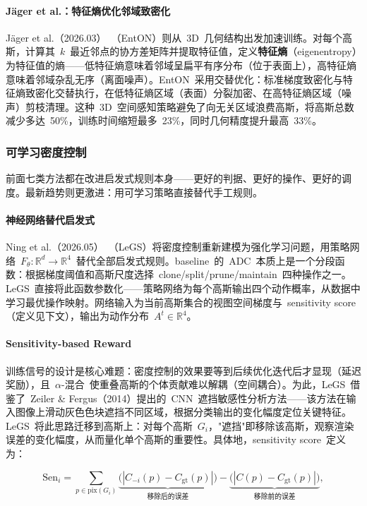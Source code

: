\paragraph{Jäger et al.：特征熵优化邻域致密化}
Jäger et al.（2026.03）~\cite{2603_06216}（EntON）则从~3D~几何结构出发加速训练。对每个高斯，计算其~$k$~最近邻点的协方差矩阵并提取特征值，定义\textbf{特征熵}（eigenentropy）为特征值的熵——低特征熵意味着邻域呈扁平有序分布（位于表面上），高特征熵意味着邻域杂乱无序（离面噪声）。EntON~采用交替优化：标准梯度致密化与特征熵致密化交替执行，在低特征熵区域（表面）分裂加密、在高特征熵区域（噪声）剪枝清理。这种~3D~空间感知策略避免了向无关区域浪费高斯，将高斯总数减少多达~50\%，训练时间缩短最多~23\%，同时几何精度提升最高~33\%。

\subsubsection{可学习密度控制}

前面七类方法都在改进启发式规则本身——更好的判据、更好的操作、更好的调度。最新趋势则更激进：用可学习策略直接替代手工规则。

\paragraph{神经网络替代启发式}

Ning et al.（2026.05）~\cite{2605_00408}（LeGS）将密度控制重新建模为强化学习问题，用策略网络~$F_\theta: \mathbb{R}^d \to \mathbb{R}^4$~替代全部启发式规则。baseline~的~ADC~本质上是一个分段函数：根据梯度阈值和高斯尺度选择~clone/split/prune/maintain~四种操作之一。LeGS~直接将此函数参数化——策略网络为每个高斯输出四个动作概率，从数据中学习最优操作映射。网络输入为当前高斯集合的视图空间梯度与~sensitivity score（定义见下文），输出为动作分布~$A^t \in \mathbb{R}^4$。

\paragraph{Sensitivity-based Reward} 训练信号的设计是核心难题：密度控制的效果要等到后续优化迭代后才显现（延迟奖励），且~$\alpha$-混合~使重叠高斯的个体贡献难以解耦（空间耦合）。为此，LeGS~借鉴了~Zeiler \& Fergus（2014）提出的~CNN~遮挡敏感性分析方法——该方法在输入图像上滑动灰色色块遮挡不同区域，根据分类输出的变化幅度定位关键特征。LeGS~将此思路迁移到高斯上：对每个高斯~$G_i$，"遮挡"即移除该高斯，观察渲染误差的变化幅度，从而量化单个高斯的重要性。具体地，sensitivity score~定义为：

\begin{equation}
  \text{Sen}_i = \sum_{p \in \text{pix}(G_i)} \underbrace{\bigl(|C_{-i}(p) - C_{\text{gt}}(p)|\bigr)}_{\text{移除后的误差}} - \underbrace{\bigl(|C(p) - C_{\text{gt}}(p)|\bigr)}_{\text{移除前的误差}},
\end{equation}

